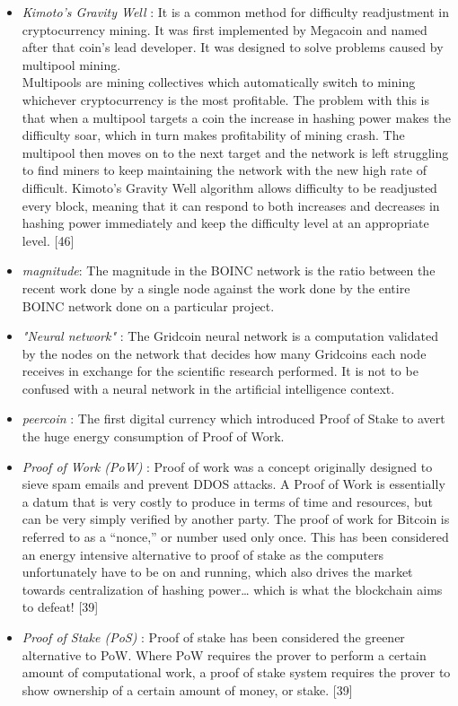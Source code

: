 \begin{itemize}
  \item \textit{Kimoto's Gravity Well} : It is a common method for difficulty readjustment in cryptocurrency mining. 
  It was first implemented by Megacoin and named after that coin’s lead developer. It was designed to solve problems caused by multipool mining.\\
  Multipools are mining collectives which automatically switch to mining whichever cryptocurrency is the most profitable. The problem with this is that when a multipool targets a coin the increase in hashing power makes the difficulty soar, which in turn makes profitability of mining crash. The multipool then moves on to the next target and the network is left struggling to find miners to keep maintaining the network with the new high rate of difficult. Kimoto’s Gravity Well algorithm allows difficulty to be readjusted every block, meaning that it can respond to both increases and decreases in hashing power immediately and keep the difficulty level at an appropriate level. [46]
  \item \textit{magnitude}: The magnitude in the BOINC network is the ratio between the recent work done by a single node against the work done by the entire BOINC network done on a particular project.
  \item \textit{"Neural network"} : The Gridcoin neural network is a computation validated by the nodes on the network that decides how many Gridcoins each node receives in exchange for the scientific research performed. It is not to be confused with a neural network in the artificial intelligence context.
  \item \textit{peercoin} : The first digital currency which introduced Proof of Stake to avert the huge energy consumption of Proof of Work.
  \item \textit{Proof of Work (PoW)} : Proof of work was a concept originally designed to sieve spam emails and prevent DDOS attacks. A Proof of Work is essentially a datum that is very costly to produce in terms of time and resources, but can be very simply verified by another party. The proof of work for Bitcoin is referred to as a “nonce,” or number used only once. This has been considered an energy intensive alternative to proof of stake as the computers unfortunately have to be on and running, which also drives the market towards centralization of hashing power… which is what the blockchain aims to defeat! [39]
  \item \textit{Proof of Stake (PoS)} : Proof of stake has been considered the greener alternative to PoW. Where PoW requires the prover to perform a certain amount of computational work, a proof of stake system requires the prover to show ownership of a certain amount of money, or stake. [39]

\end{itemize}

